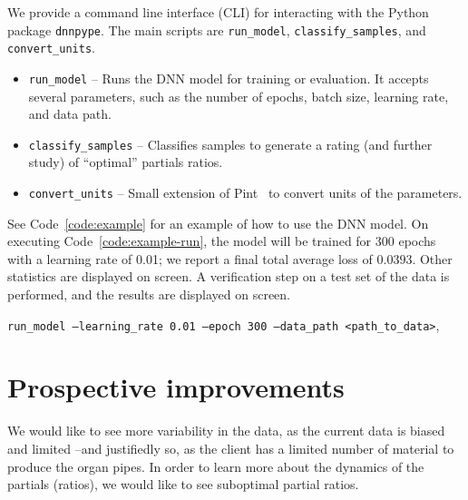 \documentclass{psu-report}
\newenvironment{code}{\begin{listing}}{\end{listing}}
\begin{document}
We provide a command line interface (CLI) for interacting with the Python
package \texttt{dnnpype}.
The main scripts are \texttt{run\_model}, \texttt{classify\_samples}, and
\texttt{convert\_units}.
\begin{itemize}
    \item \texttt{run\_model} -- Runs the DNN model for training or evaluation.
        It accepts several parameters, such as the number of epochs, batch size,
        learning rate, and data path.
    \item \texttt{classify\_samples} -- Classifies samples to generate a rating
        (and further study) of ``optimal'' partials ratios.
    \item \texttt{convert\_units} -- Small extension of Pint~\autocite{2025Pint-1}
        to convert units of the parameters.
\end{itemize}
See Code~\autoref{code:example} for an example of how to use the DNN model.
On executing Code~\autoref{code:example-run}, 
the model will be trained for 300 epochs with a learning rate of 0.01;
we report a final total average loss of \(0.0393\).
Other statistics are displayed on screen.
A verification step on a test set of the data is performed, and the results are
displayed on screen.

\begin{code}
\label{code:example-run}
\texttt{run_model --learning_rate 0.01 --epoch 300 --data_path <path_to_data>},
\end{code}





\section{Prospective improvements}

We would like to see more variability in the data, as the current data is 
biased and limited --and justifiedly so, as the client has a limited number of
material to produce the organ pipes.
In order to learn more about the dynamics of the partials (ratios), we
would like to see suboptimal partial ratios.
\end{document}
